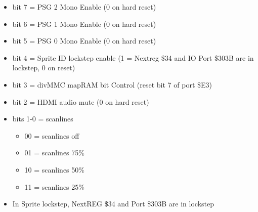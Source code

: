 \begin{itemize}
\item bit 7 = PSG 2 Mono Enable (0 on hard reset)
\item bit 6 = PSG 1 Mono Enable (0 on hard reset)
\item bit 5 = PSG 0 Mono Enable (0 on hard reset)
\item bit 4 = Sprite ID lockstep enable (1 = Nextreg \$34 and IO Port
  \$303B are in lockstep, 0 on reset)
\item bit 3 = divMMC mapRAM bit Control (reset bit 7 of port \$E3)
\item bit 2 = HDMI audio mute (0 on hard reset)
\item bits 1-0 = scanlines
  \begin{itemize}
  \item 00 = scanlines off
  \item 01 = scanlines 75\%
  \item 10 = scanlines 50\%
  \item 11 = scanlines 25\%
  \end{itemize}
\item[] In Sprite lockstep, NextREG \$34 and Port \$303B are in
  lockstep
\end{itemize}

